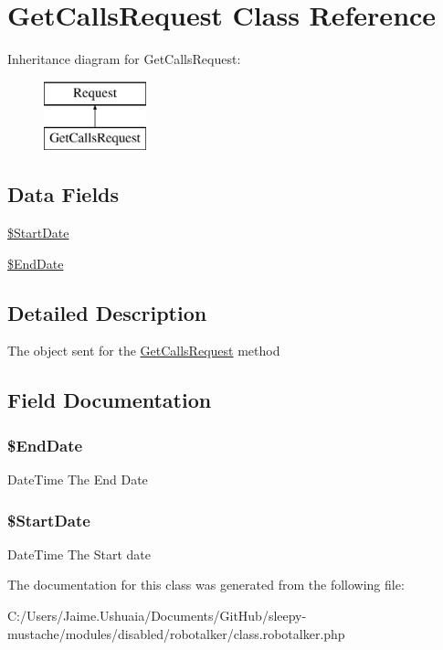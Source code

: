 \hypertarget{class_get_calls_request}{\section{Get\-Calls\-Request Class Reference}
\label{class_get_calls_request}
}
Inheritance diagram for Get\-Calls\-Request\-:\begin{figure}[H]
\begin{center}
\leavevmode
\includegraphics[height=2.000000cm]{class_get_calls_request}
\end{center}
\end{figure}
\subsection*{Data Fields}
\begin{DoxyCompactItemize}
\item 
\hyperlink{class_get_calls_request_a82e0539eeca49a1fbea42227a8f96d31}{\$\-Start\-Date}
\item 
\hyperlink{class_get_calls_request_a3ba74dcdb03b05077309a0b5a0c6788e}{\$\-End\-Date}
\end{DoxyCompactItemize}


\subsection{Detailed Description}
The object sent for the \hyperlink{class_get_calls_request}{Get\-Calls\-Request} method 

\subsection{Field Documentation}
\hypertarget{class_get_calls_request_a3ba74dcdb03b05077309a0b5a0c6788e}{
\subsubsection[{\$\-End\-Date}]{\setlength{\rightskip}{0pt plus 5cm}\$End\-Date}}\label{class_get_calls_request_a3ba74dcdb03b05077309a0b5a0c6788e}
Date\-Time The End Date \hypertarget{class_get_calls_request_a82e0539eeca49a1fbea42227a8f96d31}{
\subsubsection[{\$\-Start\-Date}]{\setlength{\rightskip}{0pt plus 5cm}\$Start\-Date}}\label{class_get_calls_request_a82e0539eeca49a1fbea42227a8f96d31}
Date\-Time The Start date 

The documentation for this class was generated from the following file\-:\begin{DoxyCompactItemize}
\item 
C\-:/\-Users/\-Jaime.\-Ushuaia/\-Documents/\-Git\-Hub/sleepy-\/mustache/modules/disabled/robotalker/class.\-robotalker.\-php\end{DoxyCompactItemize}
